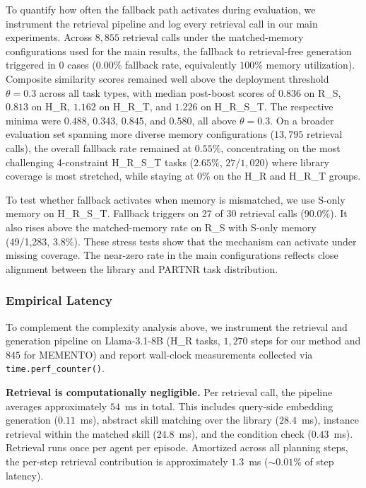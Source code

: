 \documentclass{article}
\theoremstyle{plain}
\theoremstyle{definition}
\theoremstyle{remark}
\begin{document}
To quantify how often the fallback path activates during evaluation, we instrument the retrieval pipeline and log every retrieval call in our main experiments. Across $8{,}855$ retrieval calls under the matched-memory configurations used for the main results, the fallback to retrieval-free generation triggered in $0$ cases ($0.00\%$ fallback rate, equivalently $100\%$ memory utilization). Composite similarity scores remained well above the deployment threshold $\theta=0.3$ across all task types, with median post-boost scores of $0.836$ on R\_S, $0.813$ on H\_R, $1.162$ on H\_R\_T, and $1.226$ on H\_R\_S\_T. The respective minima were $0.488$, $0.343$, $0.845$, and $0.580$, all above $\theta=0.3$. On a broader evaluation set spanning more diverse memory configurations ($13{,}795$ retrieval calls), the overall fallback rate remained at $0.55\%$, concentrating on the most challenging 4-constraint H\_R\_S\_T tasks ($2.65\%$, $27/1{,}020$) where library coverage is most stretched, while staying at $0\%$ on the H\_R and H\_R\_T groups.

To test whether fallback activates when memory is mismatched, we use S-only memory on H\_R\_S\_T. Fallback triggers on 27 of 30 retrieval calls (90.0\%). It also rises above the matched-memory rate on R\_S with S-only memory (49/1{,}283, 3.8\%). These stress tests show that the mechanism can activate under missing coverage. The near-zero rate in the main configurations reflects close alignment between the library and PARTNR task distribution.

\subsubsection{Empirical Latency}
\label{subsec:empirical_latency}

To complement the complexity analysis above, we instrument the retrieval and generation pipeline on Llama-3.1-8B (H\_R tasks, $1{,}270$ steps for our method and $845$ for MEMENTO) and report wall-clock measurements collected via \texttt{time.perf\_counter()}.

\textbf{Retrieval is computationally negligible.} Per retrieval call, the pipeline averages approximately $54$~ms in total. This includes query-side embedding generation ($0.11$~ms), abstract skill matching over the library ($28.4$~ms), instance retrieval within the matched skill ($24.8$~ms), and the condition check ($0.43$~ms). Retrieval runs once per agent per episode. Amortized across all planning steps, the per-step retrieval contribution is approximately $1.3$~ms ($\sim$$0.01\%$ of step latency).
\end{document}
